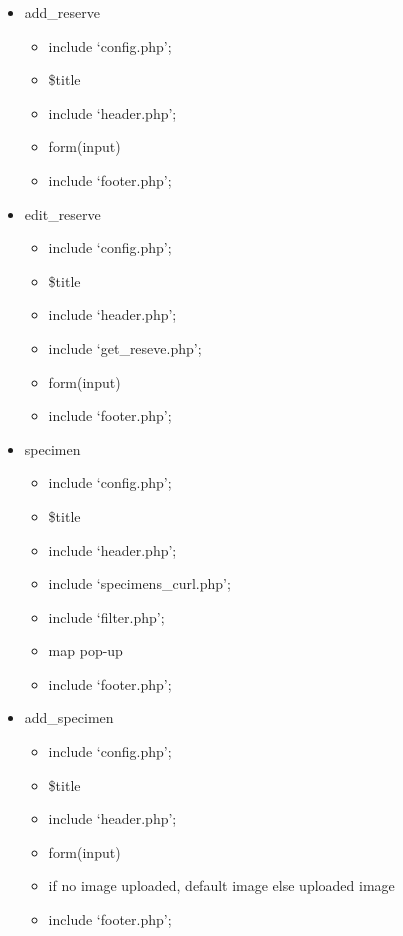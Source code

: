 \begin{itemize}
        \item add\_reserve
        \begin{itemize}
            \item include `config.php';
            \item \$title
            \item include `header.php';
            \item form(input)
            \item include `footer.php';
        \end{itemize}
        
        \item edit\_reserve
        \begin{itemize}
            \item include `config.php';
            \item \$title
            \item include `header.php';
            \item include `get\_reseve.php';
            \item form(input)
            \item include `footer.php';
        \end{itemize}
        
        \item specimen
        \begin{itemize}
            \item include `config.php';
            \item \$title
            \item include `header.php';
            \item include `specimens\_curl.php';
            \item include `filter.php';
            \item map pop-up
            \item include `footer.php';
        \end{itemize}
        
        \item add\_specimen
        \begin{itemize}
            \item include `config.php';
            \item \$title
            \item include `header.php';
            \item form(input)
            \item if no image uploaded, default image else uploaded image
            \item include `footer.php';
        \end{itemize}
        

\end{itemize}
